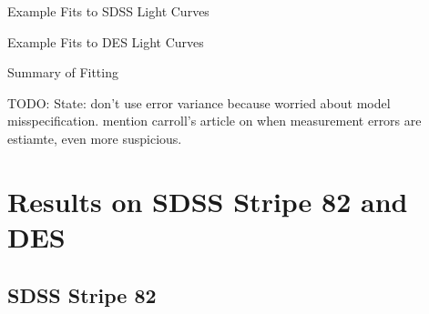 \documentclass[12pt]{beamer}
\newcommand{\todo}[1]{{\color{red}TODO: #1}}
\begin{document}
\begin{frame}{Example Fits to SDSS Light Curves}

\end{frame}

\begin{frame}{Example Fits to DES Light Curves}

\end{frame}

\begin{frame}{Summary of Fitting}

  \todo{State: don't use error variance because worried about model misspecification. mention carroll's article on when measurement errors are estiamte, even more suspicious.} 
  
\end{frame}





\section{Results on SDSS Stripe 82 and DES}


\subsection{SDSS Stripe 82}
\end{document}
